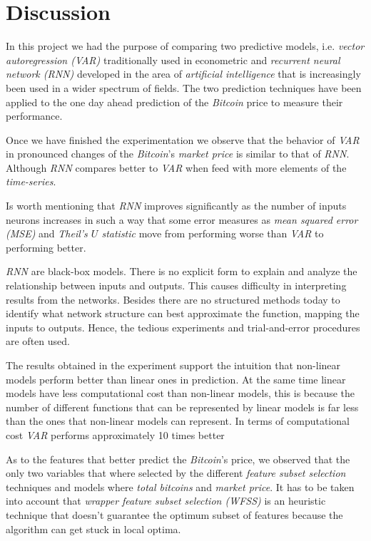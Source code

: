 
\chapter{Discussion}

\label{ch:discussion}

In this project we had the purpose of comparing two predictive models,
i.e. \textit{vector autoregression (VAR)} traditionally used in
econometric and \textit{recurrent neural network (RNN)} developed in
the area of \textit{artificial intelligence} that is increasingly been
used in a wider spectrum of fields. The two prediction techniques have
been applied to the one day ahead prediction of the \textit{Bitcoin}
price to measure their performance.

Once we have finished the experimentation we observe that the behavior
of \textit{VAR} in pronounced changes of the \textit{Bitcoin}'s
\textit{market price} is similar to that of \textit{RNN}. Although
\textit{RNN} compares better to \textit{VAR} when feed with more
elements of the \textit{time-series}.

Is worth mentioning that \textit{RNN} improves significantly as the
number of inputs neurons increases in such a way that some error
measures as \textit{mean squared error (MSE)} and \textit{Theil's $U$
statistic} move from performing worse than \textit{VAR} to performing
better.

\textit{RNN} are black-box models. There is no explicit form to
explain and analyze the relationship between inputs and outputs. This
causes difficulty in interpreting results from the networks. Besides
there are no structured methods today to identify what network
structure can best approximate the function, mapping the inputs to
outputs. Hence, the tedious experiments and trial-and-error procedures
are often used.

The results obtained in the experiment support the intuition that
non-linear models perform better than linear ones in prediction. At
the same time linear models have less computational cost than
non-linear models, this is because the number of different functions
that can be represented by linear models is far less than the ones
that non-linear models can represent. In terms of computational cost
\textit{VAR} performs approximately 10 times better

As to the features that better predict the \textit{Bitcoin}'s price,
we observed that the only two variables that where selected by the
different \textit{feature subset selection} techniques and models
where \textit{total bitcoins} and \textit{market price}. It has to be
taken into account that \textit{wrapper feature subset selection
(WFSS)} is an heuristic technique that doesn't guarantee the optimum
subset of features because the algorithm can get stuck in local
optima.

